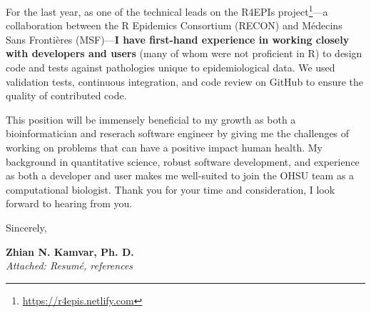 \vspace{1ex}


For the last year, as one of the technical leads on the
R4EPIs project\footnote{\url{https://r4epis.netlify.com}}---a collaboration between the
R Epidemics Consortium (RECON) and M\'{e}decins Sans Fronti\`{e}res
(MSF)---\textbf{I have first-hand experience in working closely with developers
and users} (many of whom were not proficient in R) to design code and tests
against pathologies unique to epidemiological data. We used validation tests,
continuous integration, and code review on GitHub to ensure the quality of
contributed code.

\vspace{1ex}

This position will be immensely beneficial to my growth as both a
bioinformatician and reserach software engineer by giving me the challenges of 
working on problems that can have a positive impact human health. My background
in quantitative science, robust software development, and experience as both a
developer and user makes me well-suited to join the OHSU team as a
computational biologist.  Thank you for your time and consideration, I look
forward to hearing from you. 

\vspace{2ex}

Sincerely,

\vspace{5ex}

\textbf{Zhian N. Kamvar, Ph. D.}\\
\textit{Attached: Resum\'{e}, references}













\clearpage
